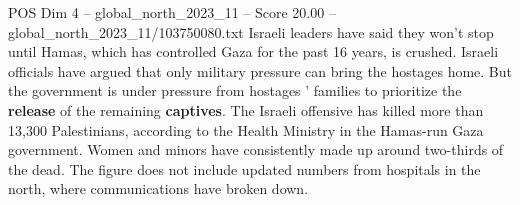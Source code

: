 \begin{textsample}{POS Dim 4 – global\_north\_2023\_11 – Score 20.00 – global\_north\_2023\_11/103750080.txt}
Israeli leaders have said they won't stop until Hamas, which has controlled Gaza for the past 16 years, is crushed.
Israeli officials have argued that only military pressure can bring the hostages home.
But the government is under pressure from hostages ' families to prioritize the \textbf{release} of the remaining \textbf{captives}.
The Israeli offensive has killed more than 13,300 Palestinians, according to the Health Ministry in the Hamas-run Gaza government.
Women and minors have consistently made up around two-thirds of the dead.
The figure does not include updated numbers from hospitals in the north, where communications have broken down.

\end{textsample}
